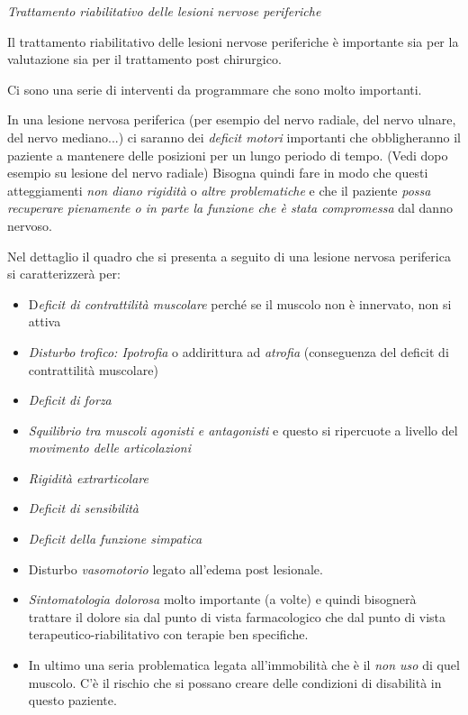 \documentclass[]{article}
\date{}
\begin{document}
\emph{Trattamento riabilitativo delle lesioni nervose periferiche}

Il trattamento riabilitativo delle lesioni nervose periferiche è
importante sia per la valutazione sia per il trattamento post
chirurgico.

Ci sono una serie di interventi da programmare che sono molto
importanti.

In una lesione nervosa periferica (per esempio del nervo radiale, del
nervo ulnare, del nervo mediano...) ci saranno dei \emph{deficit motori}
importanti che obbligheranno il paziente a mantenere delle posizioni per
un lungo periodo di tempo. (Vedi dopo esempio su lesione del nervo
radiale) Bisogna quindi fare in modo che questi atteggiamenti \emph{non
diano rigidità} o \emph{altre problematiche} e che il paziente
\emph{possa recuperare pienamente o in parte la funzione che è stata
compromessa} dal danno nervoso.

Nel dettaglio il quadro che si presenta a seguito di una lesione nervosa
periferica si caratterizzerà per:

\begin{itemize}
\item
  D\emph{eficit di contrattilità muscolare} perché se il muscolo non è
  innervato, non si attiva
\item
  \emph{Disturbo trofico: Ipotrofia} o addirittura ad \emph{atrofia}
  (conseguenza del deficit di contrattilità muscolare)
\item
  \emph{Deficit di forza }
\item
  \emph{Squilibrio tra muscoli agonisti e antagonisti} e questo si
  ripercuote a livello del \emph{movimento delle articolazioni}
\item
  \emph{Rigidità extrarticolare }
\item
  \emph{Deficit di sensibilità}
\item
  \emph{Deficit della funzione simpatica}
\item
  Disturbo \emph{vasomotorio} legato all'edema post lesionale.
\item
  \emph{Sintomatologia dolorosa} molto importante (a volte) e quindi
  bisognerà trattare il dolore sia dal punto di vista farmacologico che
  dal punto di vista terapeutico-riabilitativo con terapie ben
  specifiche.
\item
  In ultimo una seria problematica legata all'immobilità che è il
  \emph{non uso} di quel muscolo. C'è il rischio che si possano creare
  delle condizioni di disabilità in questo paziente.
\end{itemize}
\end{document}
